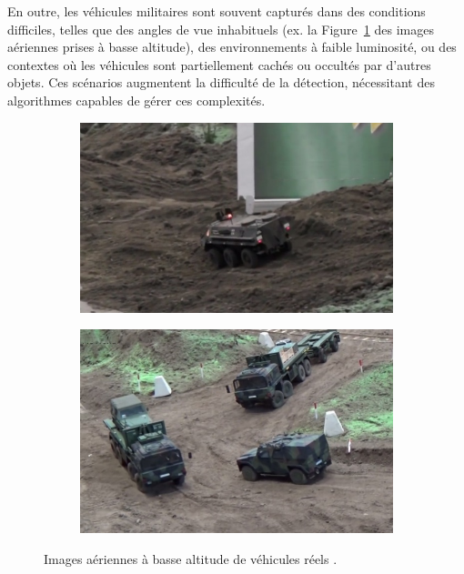 En outre, les véhicules militaires sont souvent capturés dans des conditions difficiles, telles que des angles de vue inhabituels (ex. la Figure~\ref{fig:comparaison_vehicles} des images aériennes prises à basse altitude), des environnements à faible luminosité, ou des contextes où les véhicules sont partiellement cachés ou occultés par d'autres objets. Ces scénarios augmentent la difficulté de la détection, nécessitant des algorithmes capables de gérer ces complexités.

\begin{figure}[H]
    \centering
    \begin{subfigure}[b]{0.45\textwidth}
        \centering
        \includegraphics[width=\textwidth]{./images/1-military-vehicul.png}
        \caption{}
    \end{subfigure}
    \hfill
    \begin{subfigure}[b]{0.45\textwidth}
        \centering
        \includegraphics[width=\textwidth]{./images/1-military-vehicul-2.png}
        \caption{}
    \end{subfigure}
    \caption{Images aériennes à basse altitude de véhicules réels \cite[p.~2]{kamran2020}.}
    \label{fig:comparaison_vehicles}
\end{figure}


